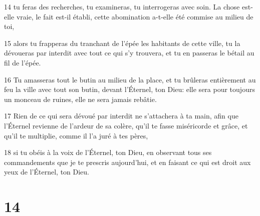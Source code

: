 \par 14 tu feras des recherches, tu examineras, tu interrogeras avec soin. La chose est-elle vraie, le fait est-il établi, cette abomination a-t-elle été commise au milieu de toi,
\par 15 alors tu frapperas du tranchant de l'épée les habitants de cette ville, tu la dévoueras par interdit avec tout ce qui s'y trouvera, et tu en passeras le bétail au fil de l'épée.
\par 16 Tu amasseras tout le butin au milieu de la place, et tu brûleras entièrement au feu la ville avec tout son butin, devant l'Éternel, ton Dieu: elle sera pour toujours un monceau de ruines, elle ne sera jamais rebâtie.
\par 17 Rien de ce qui sera dévoué par interdit ne s'attachera à ta main, afin que l'Éternel revienne de l'ardeur de sa colère, qu'il te fasse miséricorde et grâce, et qu'il te multiplie, comme il l'a juré à tes pères,
\par 18 si tu obéis à la voix de l'Éternel, ton Dieu, en observant tous ses commandements que je te prescris aujourd'hui, et en faisant ce qui est droit aux yeux de l'Éternel, ton Dieu.

\chapter{14}


